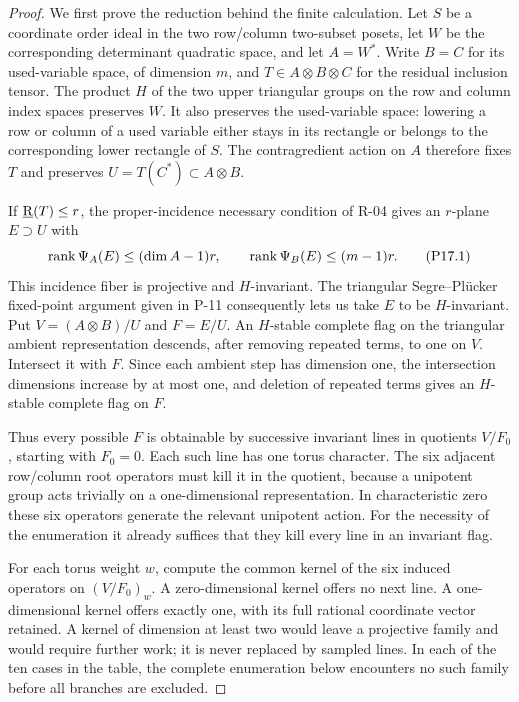\begin{proof}
We first prove the reduction behind the finite calculation.
Let $S$ be a coordinate order ideal in the two row/column two-subset
posets, let $W$ be the corresponding determinant quadratic space, and
let $A=W^*$. Write $B=C$ for its used-variable space, of dimension $m$,
and $T\in A\otimes B\otimes C$ for the residual inclusion tensor.
The product $H$ of the two upper triangular groups on the row and
column index spaces preserves $W$. It also preserves the used-variable
space: lowering a row or column of a used variable either stays in
its rectangle or belongs to the corresponding lower rectangle of $S$.
The contragredient action on $A$ therefore fixes $T$ and preserves
$U=T(C^*)\subset A\otimes B$.

If $\underline{\mathrm R}(T)\le r$, the proper-incidence necessary condition of R-04
gives an $r$-plane $E\supset U$ with
\[
 \operatorname{rank}\Psi_A(E)\le(\dim A-1)r,\qquad
 \operatorname{rank}\Psi_B(E)\le(m-1)r.
 \tag{P17.1}
\]
This incidence fiber is projective and $H$-invariant. The triangular
Segre--Pl\"ucker fixed-point argument given in P-11 consequently lets
us take $E$ to be $H$-invariant. Put $V=(A\otimes B)/U$ and
$F=E/U$. An $H$-stable complete flag on the triangular ambient
representation descends, after removing repeated terms, to one on
$V$. Intersect it with $F$. Since each ambient step has dimension one,
the intersection dimensions increase by at most one, and deletion of
repeated terms gives an $H$-stable complete flag on $F$.

Thus every possible $F$ is obtainable by successive invariant lines
in quotients $V/F_0$, starting with $F_0=0$. Each such line has one
torus character. The six adjacent row/column root operators must kill
it in the quotient, because a unipotent group acts trivially on a
one-dimensional representation. In characteristic zero these six
operators generate the relevant unipotent action. For the necessity
of the enumeration it already suffices that they kill every line in
an invariant flag.

For each torus weight $w$, compute the common kernel of the six
induced operators on $(V/F_0)_w$. A zero-dimensional kernel offers no
next line. A one-dimensional kernel offers exactly one, with its full
rational coordinate vector retained. A kernel of dimension at least
two would leave a projective family and would require further work;
it is never replaced by sampled lines. In each of the ten cases in
the table, the complete enumeration below encounters no such family
before all branches are excluded.


\end{proof}
